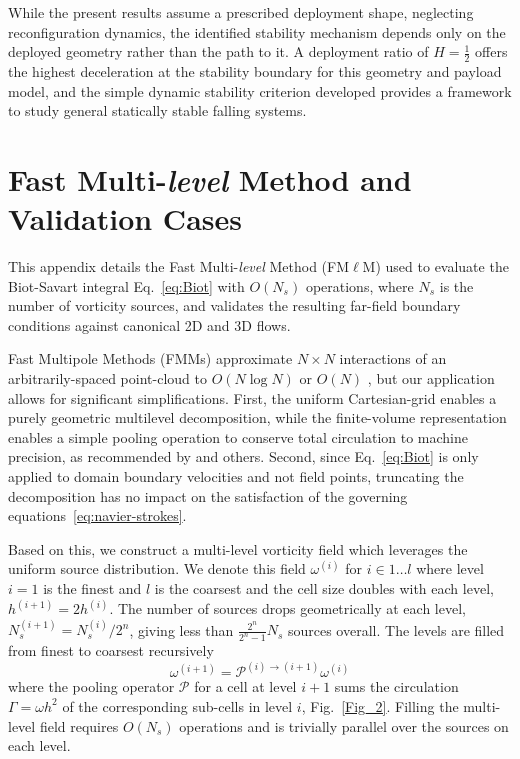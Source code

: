 \documentclass[lineno]{JFM-FLM_Au}
\begin{document}
While the present results assume a prescribed deployment shape, neglecting reconfiguration dynamics, the identified stability mechanism depends only on the deployed geometry rather than the path to it. A deployment ratio of $H=\tfrac{1}{2}$ offers the highest deceleration at the stability boundary for this geometry and payload model, and the simple dynamic stability criterion developed provides a framework to study general statically stable falling systems.

\appendix
\section{Fast Multi-\textit{level} Method and Validation Cases}\label{app:validation}

This appendix details the Fast Multi-\textit{level} Method (FM$\ell$M) used to evaluate the Biot-Savart integral Eq.~\ref{eq:Biot} with $O(N_s)$ operations, where $N_s$ is the number of vorticity sources, and validates the resulting far-field boundary conditions against canonical 2D and 3D flows.

Fast Multipole Methods (FMMs) approximate $N \times N$ interactions of an arbitrarily-spaced point-cloud to $O(N\log N)$ or $O(N)$ \citep{Greencard1987ASimulations, Fong2009TheMethod}, but our application allows for significant simplifications. First, the uniform Cartesian-grid enables a purely geometric multilevel decomposition, while the finite-volume representation enables a simple pooling operation to conserve total circulation to machine precision, as recommended by \cite{Colonius2008} and others. Second, since Eq.~\ref{eq:Biot} is only applied to domain boundary velocities and not field points, truncating the decomposition has no impact on the satisfaction of the governing equations~\ref{eq:navier-strokes}. 

Based on this, we construct a multi-level vorticity field which leverages the uniform source distribution. We denote this field $\omega^{(i)}$ for $i\in 1\ldots l$ where level $i=1$ is the finest and $l$ is the coarsest and the cell size doubles with each level, $h^{(i+1)}=2h^{(i)}$. The number of sources drops geometrically at each level, $N_s^{(i+1)}=N_s^{(i)}/2^n$, giving less than $\frac{2^n}{2^n-1} N_s$ sources overall. The levels are filled from finest to coarsest recursively 
\begin{equation}
    \omega^{(i+1)}=\mathcal{P}^{(i)\to(i+1)}\omega^{(i)}
\end{equation}
where the pooling operator $\mathcal{P}$ for a cell at level $i+1$ sums the circulation $\Gamma=\omega h^2$ of the corresponding sub-cells in level $i$, Fig.~\ref{Fig_2}. Filling the multi-level field requires $O(N_s)$ operations and is trivially parallel over the sources on each level.
\end{document}
